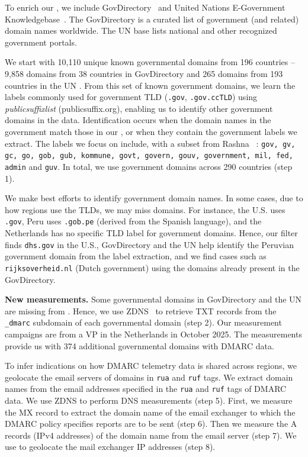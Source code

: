 To enrich our \dataset, we include GovDirectory~\cite{govdirectory} and United Nations E-Government Knowledgebase~\cite{_EGOVKBUnitedNations_}. The GovDirectory is a curated list of government (and related) domain names worldwide. The UN base lists national and other recognized government portals.

We start with 10,110 unique known governmental domains from 196 countries -- 9,858 domains from 38 countries in GovDirectory and 265 domains from 193 countries in the UN \dataset.
From this set of known government domains, we learn the labels commonly used for government \gls{TLD} (\eg \texttt{.gov}, \texttt{.gov.ccTLD}) using \textit{publicsuffixlist} (publicsuffix.org), enabling us to identify other government domains in the \openintel data. Identification occurs when the domain names in the government \datasets match those in our \dataset, or when they contain the government labels we extract. The labels we focus on include, with a subset from Rashna \etal~\cite{rashna2024}: \texttt{gov, gv, gc, go, gob, gub, kommune, govt, govern, gouv, government, mil, fed, admin} and \texttt{guv}. In total, we use government domains across 290 countries (step 1).

We make best efforts to identify government domain names. In some cases, due to how regions use the \glspl{TLD}, we may miss domains. For instance, the U.S. uses \texttt{.gov}, Peru uses \texttt{.gob.pe} (derived from the Spanish language), and the Netherlands has no specific \gls{TLD} label for government domains. Hence, our filter finds \texttt{dhs.gov} in the U.S., GovDirectory and the UN \datasets help identify the Peruvian government domain from the label extraction, and we find cases such as \texttt{rijksoverheid.nl} (Dutch government) using the domains already present in the GovDirectory.

\textbf{New measurements.} Some governmental domains in GovDirectory and the UN \dataset are missing from \openintel \dataset. Hence, we use ZDNS~\cite{Izhikevich_ZDNS_A_Fast_2022} to retrieve TXT records from the \texttt{\_dmarc} subdomain of each governmental domain (step 2). Our measurement campaigns are from a \gls{VP} in the Netherlands in October 2025. The measurements provide us with 374 additional governmental domains with \gls{DMARC} data.

To infer indications on how \gls{DMARC} telemetry data is shared across regions, we geolocate the email servers of domains in \texttt{rua} and \texttt{ruf} tags. We extract domain names from the email addresses specified in the \texttt{rua} and \texttt{ruf} tags of \gls{DMARC} data. We use ZDNS to perform \gls{DNS} measurements (step 5). First, we measure the MX record to extract the domain name of the email exchanger to which the \gls{DMARC} policy specifies reports are to be sent (step 6). Then we measure the A records (IPv4 addresses) of the domain name from the email server (step 7). We use \iptwolocation to geolocate the mail exchanger IP addresses (step 8).

